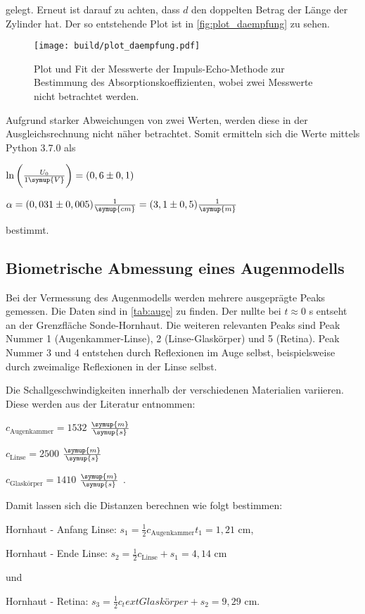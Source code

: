 gelegt. Erneut ist darauf zu achten, dass $d$ den doppelten Betrag der Länge der Zylinder hat.
Der so entstehende Plot ist in \autoref{fig:plot_daempfung} zu sehen.

\begin{figure}
    \centering
    \texttt{[image: build/plot\_daempfung.pdf]}
    \caption{Plot und Fit der Messwerte der Impuls-Echo-Methode zur Bestimmung des Absorptionskoeffizienten, wobei zwei Messwerte nicht betrachtet werden.}
    \label{fig:plot_daempfung}
\end{figure}

Aufgrund starker Abweichungen von zwei Werten, werden diese in der Ausgleichsrechnung nicht näher betrachtet.
Somit ermitteln sich die Werte mittels Python 3.7.0 als

\begin{center}
    $\ln \bigg( \frac{U_0}{1\symup{V}} \bigg) = (0,6 \pm 0,1)$

    $\alpha = (0,031 \pm 0,005) \frac{1}{\symup{cm}} = (3,1 \pm 0,5) \frac{1}{\symup{m}}$
\end{center}

bestimmt.

\subsection{Biometrische Abmessung eines Augenmodells}

Bei der Vermessung des Augenmodells werden mehrere ausgeprägte Peaks gemessen. Die Daten sind in \autoref{tab:auge} zu finden.
Der nullte bei $t \approx 0$ s entseht an der Grenzfläche Sonde-Hornhaut. Die weiteren relevanten Peaks sind Peak Nummer 1 (Augenkammer-Linse), 2 (Linse-Glaskörper) und 5 (Retina).
Peak Nummer 3 und 4 entstehen durch Reflexionen im Auge selbst, beispielsweise durch zweimalige Reflexionen in der Linse selbst.



Die Schallgeschwindigkeiten innerhalb der verschiedenen Materialien variieren. Diese werden aus der Literatur entnommen:

\begin{center}
    $c_\text{Augenkammer} = 1532$ $\frac{\symup{m}}{\symup{s}}$\cite[63]{augeZahlen}

    $c_\text{Linse} = 2500$ $\frac{\symup{m}}{\symup{s}}$ \cite{US1}

    $c_\text{Glaskörper} = 1410$ $\frac{\symup{m}}{\symup{s}}$ \cite{US1}.
\end{center}

Damit lassen sich die Distanzen berechnen wie folgt bestimmen:

\begin{center}
    Hornhaut - Anfang Linse: $s_1 = \frac{1}{2} c_\text{Augenkammer} t_1 = 1,21$ cm,

    Hornhaut - Ende Linse: $s_2 = \frac{1}{2} c_\text{Linse} + s_1 = 4,14$ cm

    und

    Hornhaut - Retina: $s_3 = \frac{1}{2} c_text{Glaskörper} + s_2 = 9,29$ cm.
\end{center}